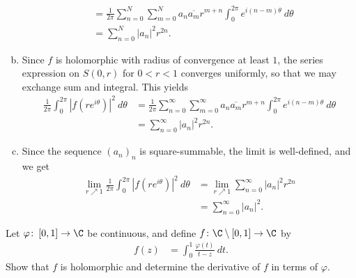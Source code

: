 \documentclass[10pt]{mypackage}
\begin{document}
\begin{solution}
\begin{enumerate}[(a)]
\begin{align*}
                                                                                                       &= \frac{1}{2\pi} \sum_{n=0}^{N}\sum_{m=0}^{N} a_n \overline{a_m} r^{m + n} \int_{0}^{2\pi} e^{i\left( n-m \right)\theta}\:d\theta\\
                                                                                                       &= \sum_{n=0}^{N} \left\vert a_n \right\vert^2 r^{2n}.
      \end{align*}
    \item Since $f$ is holomorphic with radius of convergence at least $1$, the series expression on $ S\left( 0,r \right) $ for $0 < r < 1$ converges uniformly, so that we may exchange sum and integral. This yields
      \begin{align*}
        \frac{1}{2\pi} \int_{0}^{2\pi} \left\vert f\left( re^{i\theta} \right) \right\vert^2\:d\theta &= \frac{1}{2\pi}\sum_{n=0}^{\infty}\sum_{m=0}^{\infty}a_n \overline{a_m} r^{m + n} \int_{0}^{2\pi} e^{i\left( n-m \right)\theta}\:d\theta\\
                                                                                                      &= \sum_{n=0}^{\infty}\left\vert a_n \right\vert^2 r^{2n}.
      \end{align*}
    \item Since the sequence $\left( a_n \right)_n$ is square-summable, the limit is well-defined, and we get
      \begin{align*}
        \lim_{r\nearrow 1} \frac{1}{2\pi} \int_{0}^{2\pi} \left\vert f\left( re^{i\theta} \right) \right\vert^2\:d\theta &= \lim_{r\nearrow 1} \sum_{n=0}^{\infty}\left\vert a_n \right\vert^2 r^{2n}\\
                                                                                                                         &= \sum_{n=0}^{\infty}\left\vert a_n \right\vert^2.
      \end{align*}
  \end{enumerate}
\end{solution}
\begin{problem}[Problem 2]
  Let $\varphi\colon \left[ 0,1 \right]\rightarrow \C$ be continuous, and define $f\colon \C\setminus \left[ 0,1 \right]\rightarrow \C$ by
  \begin{align*}
    f(z) &= \int_{0}^{1} \frac{\varphi(t)}{t-z}\:dt.
  \end{align*}
  Show that $f$ is holomorphic and determine the derivative of $f$ in terms of $\varphi$.
\end{problem}
\end{document}
